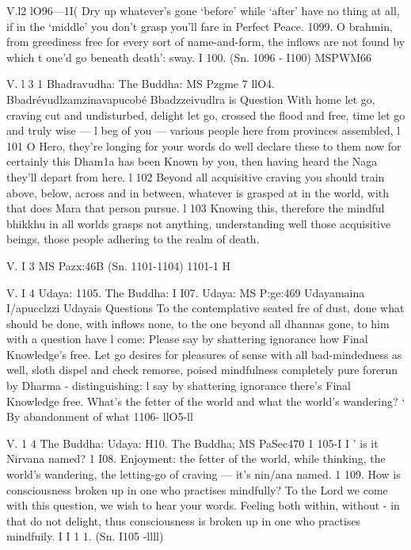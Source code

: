    
   
   V.l2 lO96—1I(
   Dry up whatever's gone `before'
   while `after' have no thing at all,
   if in the `middle' you don't grasp
   you'll fare in Perfect Peace. 1099.
   O brahmin, from greediness free
   for every sort of name-and-form,
   the inﬂows are not found by which
   t one'd go beneath death': sway. I 100.
   (Sn. 1096 - I100)
   MSPWM66
   
   
   
   V. l 3 1
   Bhadravudha:
   The Buddha:
   MS Pzgme 7
   llO4.
   Bbadrévudlzamzinavapucobé
   Bbadzzeivudlra is Question
   With home let go, craving cut and undisturbed,
   delight let go, crossed the ﬂood and free,
   time let go and truly wise — l beg of you —
   various people here from provinces assembled, l 101
   O Hero, they're longing for your words
   do well declare these to them now
   for certainly this Dham1a has been Known by you,
   then having heard the Naga they'll depart from here.
   l 102
   Beyond all acquisitive craving you should train
   above, below, across and in between,
   whatever is grasped at in the world,
   with that does Mara that person pursue. l 103
   Knowing this, therefore the mindful bhikkhu
   in all worlds grasps not anything,
   understanding well those acquisitive beings,
   those people adhering to the realm of death.
   
   
   
   V. I 3
   MS Pazx:46B
   (Sn. 1101-1104)
   1101-1 H
   
   
   
   V. I 4
   Udaya:
   1105.
   The Buddha:
   I I07.
   Udaya:
   MS P:ge:469
   Udayamaina I/apucclzzi
   Udayais Questions
   To the contemplative seated fre of dust,
   done what should be done, with inﬂows none,
   to the one beyond all dhannas gone,
   to him with a question have l come:
   Please say by shattering ignorance
   how Final Knowledge's free.
   Let go desires for pleasures of sense
   with all bad-mindedness as well,
   sloth dispel and check remorse,
   poised mindfulness completely pure
   forerun by Dharma - distinguishing:
   l say by shattering ignorance
   there's Final Knowledge free.
   What's the fetter of the world
   and what the world's wandering? `
   By abandonment of what
   1106-
   llO5-ll
   
   
   
   V. 1 4
   The Buddha:
   Udaya:
   H10.
   The Buddha;
   MS PaSec470
   1 105-I I '
   is it Nirvana named? 1 I08.
   Enjoyment: the fetter of the world,
   while thinking, the world's wandering,
   the letting-go of craving —
   it's nin/ana named. 1 109.
   How is consciousness broken up
   in one who practises mindfully?
   To the Lord we come with this question,
   we wish to hear your words.
   Feeling both within, without -
   in that do not delight,
   thus consciousness is broken up
   in one who practises mindfuily. I I 1 1.
   (Sn. I105 -llll)
   
